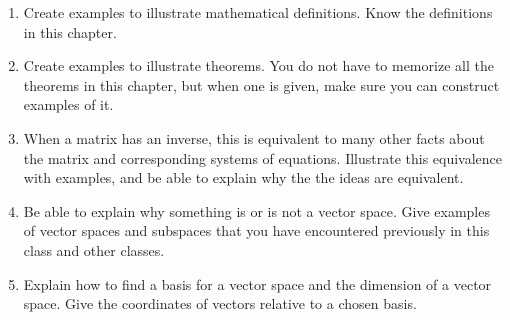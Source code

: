 
\begin{enumerate}

\item Create examples to illustrate mathematical definitions. Know the definitions in this chapter.
\item Create examples to illustrate theorems. You do not have to memorize all the theorems in this chapter, but when one is given, make sure you can construct examples of it. 
\item When a matrix has an inverse, this is equivalent to many other facts about the matrix and corresponding systems of equations.  Illustrate this equivalence with examples, and be able to explain why the the ideas are equivalent.
\item Be able to explain why something is or is not a vector space. Give examples of vector spaces and subspaces that you have encountered previously in this class and other classes.
\item Explain how to find a basis for a vector space and the dimension of a vector space. Give the coordinates of vectors relative to a chosen basis.

\end{enumerate}
